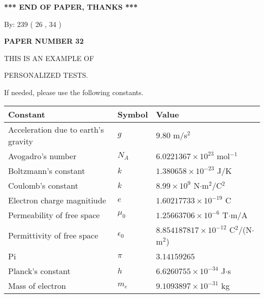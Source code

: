 \documentclass[12pt]{article}
\begin{document}
   
   
   
   
\vspace{1.0in} 
{\textbf{\large{ *** END OF PAPER, THANKS *** }}} 
   
   
\hspace{1.0in} By: 
         239 (          26 ,           34 )
   
   
   
   
\newpage 
\setcounter{page}{ 
    32001 } 
   
   
   
   
 {\textbf{ \Large{ PAPER NUMBER           32  }}}
   
   
\vspace{0.2in}
   
   
   
   
   
   
 \vspace{0.2in}
 
 
{\Huge  THIS IS AN EXAMPLE OF}
 
{\Huge  PERSONALIZED TESTS. }
 
If needed, please use the following constants.
 
 
 
\noindent\begin{tabular}{|l|l|l|}
\hline
Constant & Symbol & Value \\
\hline
Acceleration due to earth's gravity &
$g$ &
 $ 9.80 $
m/s$^2$ \\
\hline
Avogadro's number &
$N_A$ &
 $ 6.0221367 \times 10^{23} $
mol$^{-1}$ \\
\hline
Boltzmann's constant &
$k$ &
 $ 1.380658 \times 10^{-23} $
J/K \\
\hline
Coulomb's constant &
$k$ &
 $ 8.99 \times 10^{9} $
N$\cdot $m$^2$/C$^2$ \\
\hline
Electron charge magnitiude &
$e$ &
 $ 1.60217733 \times 10^{-19} $
C \\
\hline
Permeability of free space &
$\mu _0$ &
 $ 1.25663706 \times 10^{-6} $
T$\cdot $m/A \\
\hline
Permittivity of free space &
$\epsilon _0$ &
 $ 8.854187817 \times 10^{-12} $
C$^2$/(N$\cdot $m$^2$) \\
\hline
Pi &
$\pi$ &
 $ 3.14159265 $
$ $ \\
\hline
Planck's constant &
$h$ &
 $ 6.6260755 \times 10^{-34} $
J$\cdot $s \\
\hline
Mass of electron &
$m_e$ &
 $ 9.1093897 \times 10^{-31} $
kg \\
\hline
\end{tabular}
 
\end{document}
